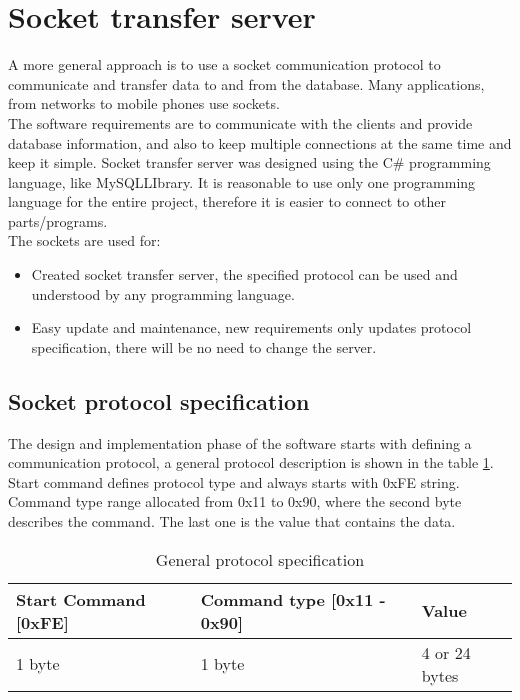 %
\section{Socket transfer server}

A more general approach is to use a socket communication \cite{bib6} protocol to communicate and transfer data to and from the database. Many applications, from networks to mobile phones \cite{bib7} use sockets. \\  The software requirements are to communicate with the clients and provide database information, and also to keep multiple connections at the same time and keep it simple.  Socket transfer server was designed using the C\# programming language, like MySQLLIbrary. It is reasonable to use only one programming language for the entire project, therefore it is easier to connect to other parts/programs. \\ The sockets are used for: 

\begin{itemize}
	\item Created socket transfer server, the specified protocol can be used and understood by any programming language.
	\item Easy update and maintenance, new requirements only updates protocol specification, there will be no need to change the server.
\end{itemize}

\subsection{Socket protocol specification}

The design and implementation phase of the software starts with defining a communication protocol, a general protocol description is shown in the table \ref{tab:protocolSpec}. Start command defines protocol type and always starts with 0xFE string. Command type range allocated from 0x11 to 0x90, where the second byte describes the command. The last one is the value that contains the data.

\begin{table}[h]
	\centering
    \begin{tabular}{ | p{4cm} | p{5cm} | p{4cm} | }
    \hline
    \textbf{Start Command} [0xFE] & \textbf{Command type} [0x11 - 0x90] & \textbf{Value}  \\ \hline
    1 byte & 1 byte & 4 or 24 bytes  \\ \hline
    \end{tabular}
	\caption{General protocol specification}
	\label{tab:protocolSpec}
\end{table}

